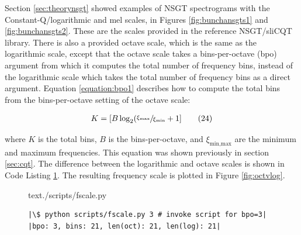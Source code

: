 \documentclass[report.tex]{subfiles}
\begin{document}
Section \ref{sec:theorynsgt} showed examples of NSGT spectrograms with the Constant-Q/logarithmic and mel scales, in Figures \ref{fig:bunchansgts1} and \ref{fig:bunchansgts2}. These are the scales provided in the reference NSGT/sliCQT library. There is also a provided octave scale, which is the same as the logarithmic scale, except that the octave scale takes a bins-per-octave (bpo) argument from which it computes the total number of frequency bins, instead of the logarithmic scale which takes the total number of frequency bins as a direct argument. Equation \eqref{equation:bpo1} describes how to compute the total bins from the bins-per-octave setting of the octave scale:

\begin{align}
	K = [B \log_{2}(\sfrac{\xi_{\text{max}}}{\xi_{\text{min}}} + 1]\tag{24}\label{equation:bpo1}
\end{align}

where $K$ is the total bins, $B$ is the bins-per-octave, and $\xi_{\text{min,max}}$ are the minimum and maximum frequencies. This equation was shown previously in section \ref{sec:cqt}. The difference between the logarithmic and octave scales is shown in Code Listing \ref{code:octvlog}. The resulting frequency scale is plotted in Figure \ref{fig:octvlog}.

\begin{figure}[h]
  \centering
 \begin{minipage}{\textwidth}
  \centering
\setlength\partopsep{-\topsep}
\begin{inputminted}[linenos,breaklines,frame=single,firstline=4,lastline=16,fontsize=\scriptsize]{text}{./scripts/fscale.py}
\end{inputminted}
 \vspace{1em}
 \end{minipage}
 \begin{minipage}{\textwidth}
  \centering
\begin{verbatim}
|\$ python scripts/fscale.py 3 # invoke script for bpo=3|
|bpo: 3, bins: 21, len(oct): 21, len(log): 21|
\end{verbatim}
 \end{minipage}
  \label{code:octvlog}
\end{figure}
\end{document}
